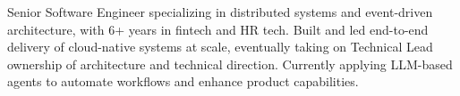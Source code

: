 \documentclass[10pt,a4paper,ragged2e,withhyper]{altacv}
\begin{document}


\makecvheader

\medskip
{\color{body}Senior Software Engineer specializing in distributed systems and event-driven architecture, with 6+ years in fintech and HR tech. Built and led end-to-end delivery of cloud-native systems at scale, eventually taking on Technical Lead ownership of architecture and technical direction. Currently applying LLM-based agents to automate workflows and enhance product capabilities.}
\medskip

\end{document}
